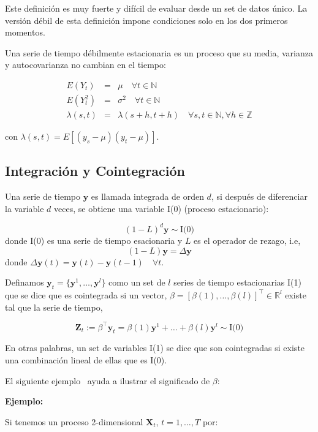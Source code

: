 Este definición es muy fuerte y difícil de evaluar desde un set de datos único.
La versión débil de esta definición impone condiciones solo en los dos primeros
momentos.

Una serie de tiempo débilmente estacionaria es un proceso que su media,
varianza y autocovarianza no cambian en el tiempo:

\begin{eqnarray*}
E(Y_t) &=& \mu  \quad \forall t \in \mathbb{N} \\ E(Y^2_t) &=&
\sigma^2  \quad \forall t \in \mathbb{N} \\
\lambda(s,t)&=&\lambda(s+h,t+h) \quad \forall s,t \in \mathbb{N},
\forall h \in \mathbb{Z}
\end{eqnarray*}

\noindent con $\lambda(s,t) = E[(y_s-\mu)(y_t - \mu)]$.

\subsection{Integración y Cointegración}
Una serie de tiempo $\mathbf{y}$ es llamada integrada de orden $d$, si después
de diferenciar la variable $d$ veces, se obtiene una variable I(0) (proceso
estacionario):

\[
(1-L)^d \mathbf{y} \sim \text{I(0)}
\]
\noindent donde I(0) es una serie de tiempo esacionaria y $L$ es el operador de rezago, i.e,
\[
(1-L)\mathbf{y} = \Delta \mathbf{y}
\]
\noindent donde $\Delta \mathbf{y}(t) = \mathbf{y}(t)  -\mathbf{y}(t-1) \quad \forall t $.

Definamos $\mathbf{y}_t = \{\mathbf{y}^1, \dots, \mathbf{y}^l\}$ como un set de $l$ series de tiempo estacionarias 
I(1) que se dice que es cointegrada si un vector,
$\beta=[\beta(1),\dots,\beta(l)]^\intercal \in \mathbb{R}^l$  existe tal que la serie de tiempo, 

\begin{equation}
 \mathbf{Z}_t:= \beta^\intercal \mathbf{y}_t = \beta(1) \mathbf{y}^1 + \dots + \beta(l) \mathbf{y}^l \sim
  \text{I(0)}
  \end{equation}

En otras palabras, un set de variables I(1) se dice que son cointegradas si
existe una combinación lineal de ellas que es I(0).

El siguiente ejemplo~\cite{johansen1995} ayuda a ilustrar el significado de
$\beta$:

\textbf{Ejemplo:}

Si tenemos un proceso 2-dimensional $\mathbf{X}_t$, $t=1,\dots,T$ por:

